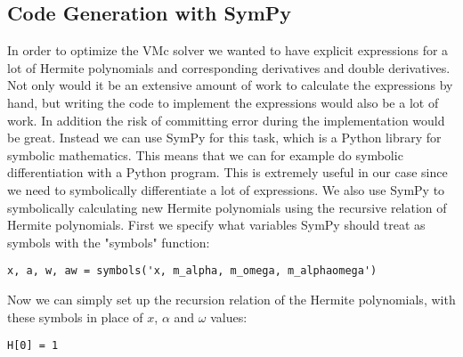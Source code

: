 \documentclass[../main.tex]{subfiles}
\begin{document}
\begin{appendices}
\chapter{Code Generation with SymPy}

In order to optimize the VMc solver we wanted to have explicit expressions for a lot of Hermite polynomials and corresponding derivatives and double derivatives. Not only would it be an extensive amount of work to calculate the expressions by hand, but writing the code to implement the expressions would also be a lot of work. In addition the risk of committing error during the implementation would be great. Instead we can use SymPy\cite{SymPy} for this task, which is a Python library for symbolic mathematics.\cite{SymPy} This means that we can for example do symbolic differentiation with a Python program. This is extremely useful in our case since we need to symbolically differentiate a lot of expressions. We also use SymPy to symbolically calculating new Hermite polynomials using the recursive relation of Hermite polynomials. First we specify what variables SymPy should treat as symbols with the "symbols" function:
\lstset{language=python}
\begin{lstlisting}[caption={}]
x, a, w, aw = symbols('x, m_alpha, m_omega, m_alphaomega')
\end{lstlisting}
Now we can simply set up the recursion relation of the Hermite polynomials, with these symbols in place of $x$, $\alpha$ and $\omega$ values:
\lstset{language=python}
\begin{lstlisting}[caption={}]
H[0] = 1


\end{lstlisting}
\end{appendices}
\end{document}

